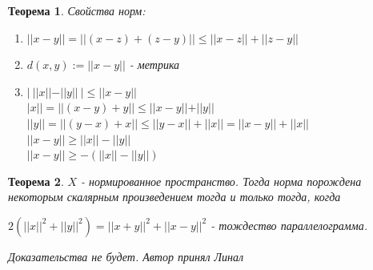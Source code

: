 \documentclass[12pt,letterpaper]{report}
\newtheorem*{theorem-non}{Теорема}
\theoremstyle{definition}
\begin{document}
    \begin{theorem-non}
        Свойства норм:
        \begin{enumerate}
            \item $||x-y||=||(x-z)+(z-y)|| \leq ||x-z||+||z-y||$
            \item $d(x, y):=||x-y||$ - метрика
            \item $|\ ||x||-||y||\ | \leq ||x-y||$ \\
            $|x|| = ||(x-y)+y|| \leq ||x-y||+||y||$ \\
            $||y|| = ||(y-x)+x|| \leq ||y-x||+||x||=||x-y||+||x||$ \\
            $||x-y||\geq ||x||-||y||$ \\
            $||x-y||\geq -(||x||-||y||)$
        \end{enumerate}
    \end{theorem-non}
    \begin{theorem-non}
        $X$ - нормированное пространство. Тогда норма порождена некоторым скалярным произведением тогда и только тогда, когда
    
        $2(||x||^2+||y||^2)=||x+y||^2+||x-y||^2$ - тождество параллелограмма.
    
        Доказательства не будет. Автор принял Линал
    \end{theorem-non}
\end{document}
